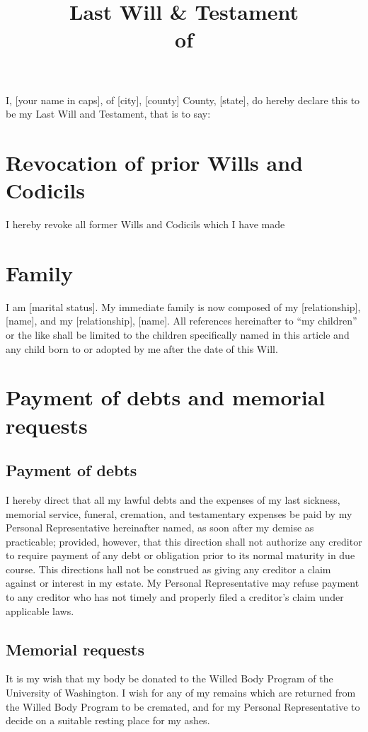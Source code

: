 \documentclass[11.5pt]{article}
\title{Last Will \& Testament\\
of\\
}
\date{}
\begin{document}
\maketitle

I, [your name in caps], of [city], [county] County, [state], do hereby declare this to be my Last Will and Testament, that is to say:

\section{Revocation of prior Wills and Codicils}
I hereby revoke all former Wills and Codicils which I have made

\section{Family}
I am [marital status]. My immediate family is now composed of my [relationship], [name], and my [relationship], [name]. All references hereinafter to ``my children'' or the like shall be limited to the children specifically named in this article and any child born to or adopted by me after the date of this Will.

\section{Payment of debts and memorial requests}
\subsection{Payment of debts}
I hereby direct that all my lawful debts and the expenses of my last sickness, memorial service, funeral, cremation, and testamentary expenses be paid by my Personal Representative hereinafter named, as soon after my demise as practicable; provided, however, that this direction shall not authorize any creditor to require payment of any debt or obligation prior to its normal maturity in due course. This directions hall not be construed as giving any creditor a claim against or interest in my estate. My Personal Representative may refuse payment to any creditor who has not timely and properly filed a creditor's claim under applicable laws. 

\subsection{Memorial requests}
It is my wish that my body be donated to the Willed Body Program of the University of Washington. I wish for any of my remains which are returned from the Willed Body Program to be cremated, and for my Personal Representative to decide on a suitable resting place for my ashes. 
\end{document}
